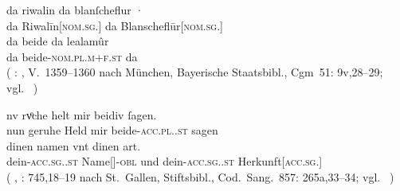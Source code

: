 \begin{exe}
\ex \label{ex:askedal73pr}
	\begin{xlist}
	\ex \label{ex:askedal73pr_1}
		\gll da riwalin da {blanſcheflur ·} \\
			da Riwalīn[\textsc{nom.sg.\MascM}] da
				Blanscheflūr[\textsc{nom.sg.\FemF}] \\
	\sn \gll da beide da lealamûr \\
			da beide-\textsc{nom.pl.m+f\subMF.st} da  \\
		\trans {}
			(%
				: , V.~1359--1360
				nach München, Bayerische Staatsbibl., Cgm~51: 9v,28--29;
				vgl.~\cite[22]{maroldschroeder1969}%
			)

	\ex \label{ex:askedal73pr_2}
		\gll nv rvͦche helt mir beidiv ſagen. \\
			nun geruhe Held mir beide-\textsc{acc.pl.\NeutI.st} sagen \\
	\sn \gll dinen namen vnt dinen art. \\
			dein-\textsc{acc.sg.\MascI.st} Name[\textsc{\MascI}]-\textsc{obl}
			und dein-\textsc{acc.sg.\MascI.st}
			Herkunft[\textsc{acc.sg.\MascI}]\footnotemark{} \\
		\trans {}
			(%
				, : 745,18--19
				nach St.~Gallen, Stiftsbibl., Cod.~Sang.~857: 265a,33--34;
				vgl.~\cite[749]{knechtschirok2003}%
			)
	\end{xlist}
\end{exe}
%

